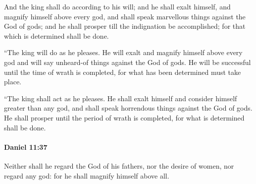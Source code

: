 			\begin{versebox}
					\item[BHS] 
					\item[LXX] 
					\item[ASV] And the king shall do according to his will; and he shall exalt himself, and magnify himself above every god, and shall speak marvellous things against the God of gods; and he shall prosper till the indignation be accomplished; for that which is determined shall be done.
					\item[NIV] “The king will do as he pleases. He will exalt and magnify himself above every god and will say unheard-of things against the God of gods. He will be successful until the time of wrath is completed, for what has been determined must take place.
					\item[NRSV] “The king shall act as he pleases. He shall exalt himself and consider himself greater than any god, and shall speak horrendous things against the God of gods. He shall prosper until the period of wrath is completed, for what is determined shall be done.
			\end{versebox}

		\paragraph{Daniel 11:37} %
			\label{DANIEL-11-37}

			Neither shall he regard the God of his fathers, nor the desire of women, nor regard any god: for he shall magnify himself above all.

